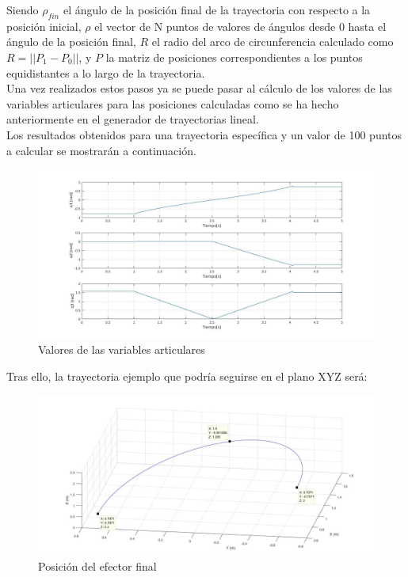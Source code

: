 \begin{itemize}
	Siendo $\rho_{fin}$ el ángulo de la posición final de la trayectoria con respecto a la posición inicial, $\rho$ el vector de N puntos de valores de ángulos desde 0 hasta el ángulo de la posición final, $R$ el radio del arco de circunferencia calculado como $R=||P_1-P_0||$, y $P$ la matriz de posiciones correspondientes a los puntos equidistantes a lo largo de la trayectoria.\\

	Una vez realizados estos pasos ya se puede pasar al cálculo de los valores de las variables articulares para las posiciones calculadas como se ha hecho anteriormente en el generador de trayectorias lineal.\\

	Los resultados obtenidos para una trayectoria específica y un valor de 100 puntos a calcular se mostrarán a continuación.
	\begin{figure}[h!]
	\centering
	\includegraphics[width=.7\textwidth]{GDT_C_articulares}
	\caption{Valores de las variables articulares}
	\end{figure}

\newpage
Tras ello, la trayectoria ejemplo que podría seguirse en el plano XYZ será:
	\begin{figure}[h!]
	\centering
	\includegraphics[width=.8\textwidth]{GDT_C_efector}
	\caption{Posición del efector final}
	\end{figure}


	
	
\end{itemize}


